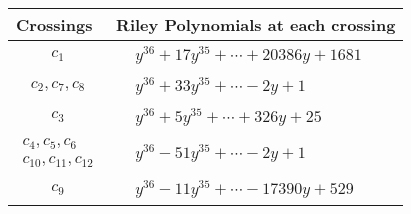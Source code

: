 \documentclass[1p]{elsarticle_modified}
\theoremstyle{definition}
\begin{document}
\begin{tabular}{m{50pt}|m{274pt}}
Crossings & \hspace{64pt}Riley Polynomials at each crossing \\
\hline $$\begin{aligned}c_{1}\end{aligned}$$&$\begin{aligned}
&y^{36}+17 y^{35}+\cdots+20386 y+1681
\end{aligned}$\\
\hline $$\begin{aligned}c_{2},c_{7},c_{8}\end{aligned}$$&$\begin{aligned}
&y^{36}+33 y^{35}+\cdots-2 y+1
\end{aligned}$\\
\hline $$\begin{aligned}c_{3}\end{aligned}$$&$\begin{aligned}
&y^{36}+5 y^{35}+\cdots+326 y+25
\end{aligned}$\\
\hline $$\begin{aligned}c_{4},c_{5},c_{6}\\c_{10},c_{11},c_{12}\end{aligned}$$&$\begin{aligned}
&y^{36}-51 y^{35}+\cdots-2 y+1
\end{aligned}$\\
\hline $$\begin{aligned}c_{9}\end{aligned}$$&$\begin{aligned}
&y^{36}-11 y^{35}+\cdots-17390 y+529
\end{aligned}$\\
\hline
\end{tabular}
\vskip 2pc
\end{document}
